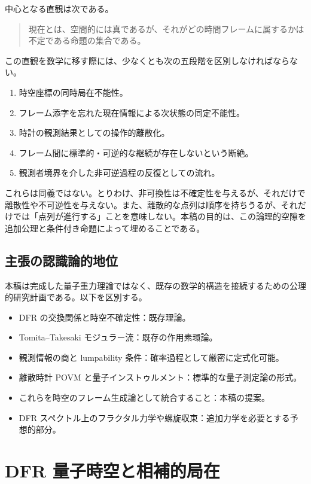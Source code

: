\documentclass[a4paper,11pt]{ltjsarticle}
\theoremstyle{remark}
\begin{document}
中心となる直観は次である。
\begin{quote}
現在とは、空間的には真であるが、それがどの時間フレームに属するかは不定である命題の集合である。
\end{quote}
この直観を数学に移す際には、少なくとも次の五段階を区別しなければならない。
\begin{enumerate}
  \item 時空座標の同時局在不能性。
  \item フレーム添字を忘れた現在情報による次状態の同定不能性。
  \item 時計の観測結果としての操作的離散化。
  \item フレーム間に標準的・可逆的な継続が存在しないという断絶。
  \item 観測者境界を介した非可逆過程の反復としての流れ。
\end{enumerate}
これらは同義ではない。とりわけ、非可換性は不確定性を与えるが、それだけで離散性や不可逆性を与えない。また、離散的な点列は順序を持ちうるが、それだけでは「点列が進行する」ことを意味しない。本稿の目的は、この論理的空隙を追加公理と条件付き命題によって埋めることである。

\subsection{主張の認識論的地位}
本稿は完成した量子重力理論ではなく、既存の数学的構造を接続するための公理的研究計画である。以下を区別する。
\begin{itemize}
  \item DFR の交換関係と時空不確定性：既存理論。
  \item Tomita--Takesaki モジュラー流：既存の作用素環論。
  \item 観測情報の商と lumpability 条件：確率過程として厳密に定式化可能。
  \item 離散時計 POVM と量子インストゥルメント：標準的な量子測定論の形式。
  \item これらを時空のフレーム生成論として統合すること：本稿の提案。
  \item DFR スペクトル上のフラクタル力学や螺旋収束：追加力学を必要とする予想的部分。
\end{itemize}

\section{DFR 量子時空と相補的局在}
\end{document}
